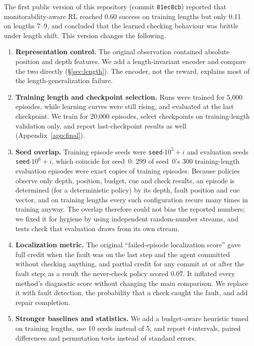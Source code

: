 The first public version of this repository (commit \texttt{81ec8cb}) reported that monitorability-aware RL reached 0.60 success on training lengths but only 0.11 on lengths 7--9, and concluded that the learned checking behaviour was brittle under length shift. This version changes the following.
\begin{enumerate}
  \item \textbf{Representation control.} The original observation contained absolute position and depth features. We add a length-invariant encoder and compare the two directly (\S\ref{sec:length}). The encoder, not the reward, explains most of the length-generalization failure.
  \item \textbf{Training length and checkpoint selection.} Runs were trained for 5{,}000 episodes, while learning curves were still rising, and evaluated at the last checkpoint. We train for 20{,}000 episodes, select checkpoints on training-length validation only, and report last-checkpoint results as well (Appendix~\ref{app:final}).
  \item \textbf{Seed overlap.} Training episode seeds were \texttt{seed}$\cdot 10^5 + i$ and evaluation seeds \texttt{seed}$\cdot 10^6 + i$, which coincide for seed~0: 299 of seed~0's 300 training-length evaluation episodes were exact copies of training episodes. Because policies observe only depth, position, budget, cue and check results, an episode is determined (for a deterministic policy) by its depth, fault position and cue vector, and on training lengths every such configuration recurs many times in training anyway. The overlap therefore could not bias the reported numbers; we fixed it for hygiene by using independent random-number streams, and tests check that evaluation draws from its own stream.
  \item \textbf{Localization metric.} The original ``failed-episode localization score'' gave full credit when the fault was on the last step and the agent committed without checking anything, and partial credit for any commit at or after the fault step; as a result the never-check policy scored 0.07. It inflated every method's diagnostic score without changing the main comparison. We replace it with fault detection, the probability that a check caught the fault, and add repair completion.
  \item \textbf{Stronger baselines and statistics.} We add a budget-aware heuristic tuned on training lengths, use 10 seeds instead of 5, and report $t$-intervals, paired differences and permutation tests instead of standard errors.

\end{enumerate}
